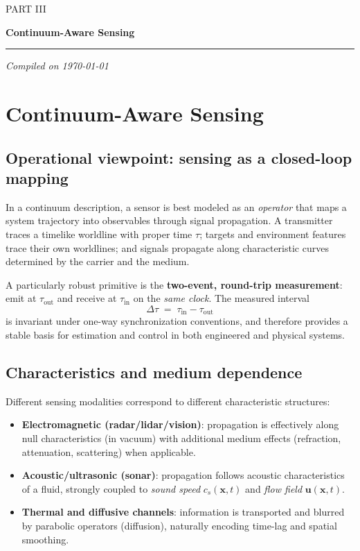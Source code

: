\documentclass[11pt]{article}
\theoremstyle{defstyle}
\theoremstyle{mapstyle}
\newcommand{\setdocheader}[1]{%
  \fancyhead[L]{\color{headerblue}\footnotesize\textbf{#1}}%
}
\newcommand{\PartDivider}[2]{%
  \clearpage
  \thispagestyle{empty}
  \begin{center}
    \vspace*{1.8cm}
    \begin{tcolorbox}[
      enhanced,
      breakable,
      colback=partbg,
      colframe=partframe,
      boxrule=1.2pt,
      arc=2.5mm,
      left=10mm,right=10mm,top=8mm,bottom=8mm,
      width=0.92\textwidth
    ]
      \centering
      {\Large\scshape\color{headerblue}#1}\par
      \vspace{0.6em}
      {\huge\bfseries\color{headerblue}#2}\par
      \vspace{0.9em}
      {\color{headerblue!70}\rule{0.72\textwidth}{0.9pt}}\par
      \vspace{0.8em}
      {\large\itshape\color{headerblue!85}Compiled on \today}\par
    \end{tcolorbox}
  \end{center}
  \clearpage
}
\begin{document}
\PartDivider{PART III}{Continuum-Aware Sensing}
{}
\setdocheader{CONTINUUM-AWARE SENSING}

\section{Continuum-Aware Sensing}
\label{sec:continuum_sensing}

\subsection{Operational viewpoint: sensing as a closed-loop mapping}
In a continuum description, a sensor is best modeled as an \emph{operator} that maps a system trajectory into observables through signal propagation.
A transmitter traces a timelike worldline with proper time $\tau$; targets and environment features trace their own worldlines; and signals propagate along characteristic curves determined by the carrier and the medium.

A particularly robust primitive is the \textbf{two-event, round-trip measurement}: emit at $\tau_{\text{out}}$ and receive at $\tau_{\text{in}}$ on the \emph{same clock}.
The measured interval
\begin{equation}
\Delta \tau \;=\; \tau_{\text{in}}-\tau_{\text{out}}
\end{equation}
is invariant under one-way synchronization conventions, and therefore provides a stable basis for estimation and control in both engineered and physical systems.

\subsection{Characteristics and medium dependence}
Different sensing modalities correspond to different characteristic structures:

\begin{itemize}[leftmargin=*, itemsep=3pt]
  \item \textbf{Electromagnetic (radar/lidar/vision)}: propagation is effectively along null characteristics (in vacuum) with additional medium effects (refraction, attenuation, scattering) when applicable.
  \item \textbf{Acoustic/ultrasonic (sonar)}: propagation follows acoustic characteristics of a fluid, strongly coupled to \emph{sound speed} $c_s(\mathbf{x},t)$ and \emph{flow field} $\mathbf{u}(\mathbf{x},t)$.
  \item \textbf{Thermal and diffusive channels}: information is transported and blurred by parabolic operators (diffusion), naturally encoding time-lag and spatial smoothing.
\end{itemize}
\end{document}
